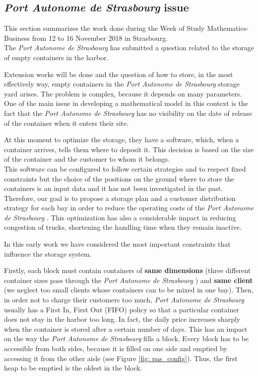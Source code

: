 \documentclass{article}
\newcommand{\PAS}{\emph{Port Autonome de Strasbourg }}
\begin{document}
\subsection{\PAS issue}
This section summarizes the work done during the Week of Study \linebreak Mathematics-Business from 12 to 16 November 2018 in Strasbourg. \\
The \PAS has submitted a question related to the storage of empty containers in the harbor. 

Extension works will be done and the question of how to store, in the most effectively way, empty containers in the \PAS storage yard arises.
The problem is complex, because it depends on many parameters.
One of the main issue in developing a mathematical model in this context is the fact that the \PAS has no visibility on the date of release of the container when it enters their site. 

At this moment to optimize the storage, they have a software, which, when a container arrives, tells them where to deposit it.
This decision is based on the size of the container and the customer to whom it belongs. \\
This software can be configured to follow certain strategies and to respect fixed constraints but the choice of the positions on the ground where to store the containers is an input data and it has not been investigated in the past. \\
Therefore, our goal is to propose a storage plan and a customer distribution strategy for each bay in order to reduce the operating costs of the \PAS. 
This optimization has also a considerable impact in reducing congestion of trucks, shortening the handling time when they remain inactive.

In this early work we have considered the most important constraints that influence the storage system.
 
Firstly, each block must contain containers of \textbf{same dimensions} (three different container sizes pass through the \PAS) and \textbf{same client} (we neglect too small clients whose containers can to be mixed in one bay). 
Then, in order not to charge their customers too much, \PAS usually has a {First In, First Out} (FIFO) policy so that a particular container does not stay in the harbor too long. 
In fact, the daily price increases sharply when the container is stored after a certain number of days. 
This has an impact on the way the \PAS fills a block. 
Every block has to be accessible from both sides, because it is filled on one side and emptied by accessing it from the other aisle (see Figure \ref{fig: pas_config}). 
Thus, the first heap to be emptied is the oldest in the block. 
\end{document}
